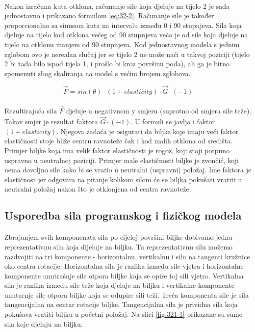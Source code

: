 \documentclass[times, utf8, diplomski]{fer}
\begin{document}
\paragraph{}
Nakon izračuna kuta otklona, računanje sile koja djeluje na tijelo 2 je sada jednostavno i 
prikazano formulom \ref{eq:32-2}. Računanje sile je također proporcionalno sa sinusom kuta 
na intervalu između 0 i 90 stupnjeva. Sila koja djeluje na tijelo kod otklona većeg od 90 
stupnjeva veća je od sile koja djeluje na tijelo na otklonu manjem od 90 stupnjeva. Kod 
jednostavnog modela s jednim zglobom ovo je nerealan slučaj jer se tijelo 2 ne može naći u  
takvoj poziciji (tijelo 2 bi tada bilo ispod tijela 1, i prošlo bi kroz površinu poda), ali 
ga je bitno spomenuti zbog skaliranja na model s većim brojem zglobova.

\begin{equation}
\vec{F} = sin(\theta) \cdot (1 + elasticity) \cdot \vec{G} \cdot (-1)
\label{eq:32-2}
\end{equation}

\paragraph{}
Rezultirajuća sila $\vec{F}$ djeluje u negativnom y smjeru (suprotno od smjera sile teže).
Takav smjer je rezultat faktora $\vec{G} \cdot (-1)$. U formuli se javlja i faktor $(1 + 
elasticity)$. Njegova zadaća je osigurati da biljke koje imaju veći faktor elastičnosti 
stoje bliže centru ravnoteže čak i kod malih otklona od središta. Primjer biljke koja ima 
velik faktor elastičnosti je rogoz, koji stoji potpuno uspravno u neutralnoj poziciji. 
Primjer male elastičnosti biljke je zvončić, koji nema dovoljno sile kako bi se vratio u 
neutralni (uspravni) položaj. Ime faktora je elastičnost jer odgovara na pitanje kolikom 
silom će se biljka pokušati vratiti u neutralni položaj nakon što je otklonjena od centra 
ravnoteže.

\subsection{Usporedba sila programskog i fizičkog modela}
\paragraph{}
Zbrajanjem svih komponenata sila po cijeloj površini biljke dobivamo jednu 
reprezentativnu silu koja dijeluje na biljku. Tu reprezentativnu silu možemo razdvojiti na 
tri komponente - horizontalnu, vertikalnu i silu na tangenti kružnice oko centra rotacije. 
Horizontalna sila je razlika između sile vjetra i horizontalne komponente unutrašnje sile 
otpora biljke koja se opire toj sili vjetra. Vertikalna sila je razlika između sile teže 
koja djeluje na biljku i vertikalne komponente unutarnje sile otpora biljke koja se odupire 
sili teži. Treća komponenta sile je sila tangencijalna na centar rotacije biljke. 
Tangencijalna sila je prividna sila koja pokušava vratiti biljku u početni položaj. Na slici 
\ref{fig:321-1} prikazane su sume sila koje djeluju na biljku.
\end{document}
